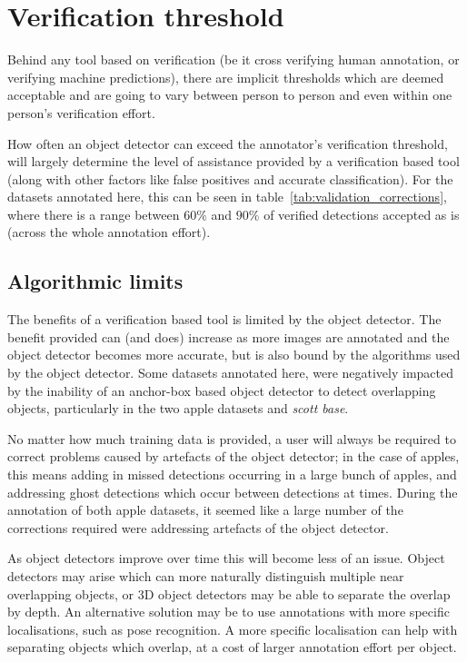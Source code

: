 \section{Verification threshold}
\label{sec:verification_threshold}

Behind any tool based on verification (be it cross verifying human annotation, or verifying machine predictions), there are implicit thresholds which are deemed acceptable and are going to vary between person to person and even within one person's verification effort. 

How often an object detector can exceed the annotator's verification threshold, will largely determine the level of assistance provided by a verification based tool (along with other factors like false positives and accurate classification). For the datasets annotated here, this can be seen in table~\ref{tab:validation_corrections}, where there is a range between $60\%$ and $90\%$ of verified detections accepted as is (across the whole annotation effort). 

\subsection{Algorithmic limits}
\label{sec:machine_limits}

The benefits of a verification based tool is limited by the object detector. The benefit provided can (and does) increase as more images are annotated and the object detector becomes more accurate, but is also bound by the algorithms used by the object detector. Some datasets annotated here, were negatively impacted by the inability of an anchor-box based object detector to detect overlapping objects, particularly in the two apple datasets and \emph{scott base}. 

No matter how much training data is provided, a user will always be required to correct problems caused by artefacts of the object detector; in the case of apples, this means adding in missed detections occurring in a large bunch of apples, and addressing ghost detections which occur between detections at times. During the annotation of both apple datasets, it seemed like a large number of the corrections required were addressing artefacts of the object detector.

As object detectors improve over time this will become less of an issue. Object detectors may arise which can more naturally distinguish multiple near overlapping objects, or 3D object detectors may be able to separate the overlap by depth. An alternative solution may be to use annotations with more specific localisations, such as pose recognition. A more specific localisation can help with separating objects which overlap, at a cost of larger annotation effort per object.


